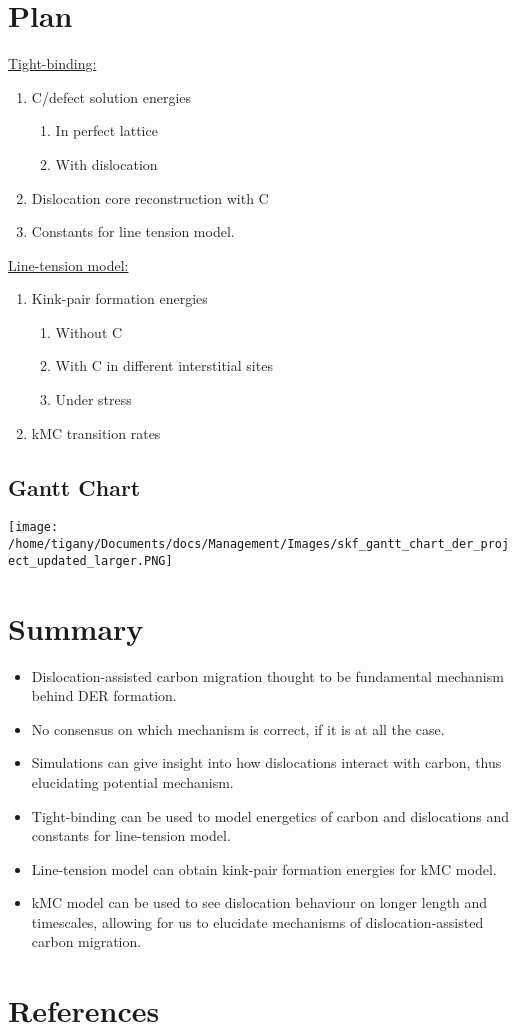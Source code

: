 \documentclass[11pt]{article}
\begin{document}
\section*{Plan}
\label{sec:org80a39e4}

\uline{Tight-binding:}
\begin{enumerate}
\item C/defect solution energies
\begin{enumerate}
\item In perfect lattice
\item With dislocation
\end{enumerate}
\item Dislocation core reconstruction with C
\item Constants for line tension model.
\end{enumerate}

\uline{Line-tension model:}
\begin{enumerate}
\item Kink-pair formation energies
\begin{enumerate}
\item Without C
\item With C in different interstitial sites
\item Under stress
\end{enumerate}
\item kMC transition rates
\end{enumerate}

\subsection*{Gantt Chart}
\label{sec:org2377a52}
\begin{center}
\texttt{[image: /home/tigany/Documents/docs/Management/Images/skf\_gantt\_chart\_der\_project\_updated\_larger.PNG]}
\label{orga6932ab}
\end{center}


\section*{Summary}
\label{sec:org1baab26}
\begin{itemize}
\item Dislocation-assisted carbon migration thought to be fundamental
mechanism behind DER formation.
\item No consensus on which mechanism is correct, if it is at all the case.
\item Simulations can give insight into how dislocations interact with
carbon, thus elucidating potential mechanism.

\item Tight-binding can be used to model energetics of carbon and
dislocations and constants for line-tension model.
\item Line-tension model can obtain kink-pair formation energies for kMC
model.
\item kMC model can be used to see dislocation behaviour on longer
length and timescales, allowing for us to elucidate mechanisms of
dislocation-assisted carbon migration.
\end{itemize}
\section*{References}
\label{sec:org9141a66}
\end{document}
